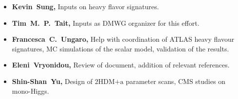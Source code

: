\documentclass[a4paper, 11pt,notoc]{article}
\newcommand{\hdma}{\ensuremath{\textrm{2HDM+a}}\xspace}
\begin{document}
\begin{itemize}
\item \textbf{Kevin~Sung,} Inputs on heavy flavor signatures. 

\item \textbf{Tim~M.~P.~Tait,} Inputs as DMWG organizer for this effort. 

\item \textbf{Francesca~C.~Ungaro,} Help with coordination of ATLAS heavy flavour signatures, MC simulations of the scalar model, validation of the results. 

\item \textbf{Eleni~Vryonidou,} Review of document, addition of relevant references.

\item \textbf{Shin-Shan~Yu,} Design of \hdma parameter scans, CMS studies on mono-Higgs.

\end{itemize}
\end{document}
